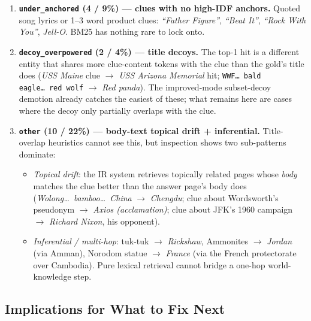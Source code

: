 \documentclass[11pt]{article}
\begin{document}
\begin{enumerate}
  \item \textbf{\texttt{under\_anchored} (4 / 9\%) --- clues with no high-IDF
        anchors.} Quoted song lyrics or 1--3 word product clues:
        \emph{``Father Figure''}, \emph{``Beat It''}, \emph{``Rock With You''},
        \emph{Jell-O}. BM25 has nothing rare to lock onto.

  \item \textbf{\texttt{decoy\_overpowered} (2 / 4\%) --- title decoys.} The
        top-1 hit is a different entity that shares more clue-content
        tokens with the clue than the gold's title does (\emph{USS Maine}
        clue $\to$ \emph{USS Arizona Memorial} hit; \texttt{WWF\ldots\ bald
        eagle\ldots\ red wolf} $\to$ \emph{Red panda}). The improved-mode
        subset-decoy demotion already catches the easiest of these; what
        remains here are cases where the decoy only partially overlaps
        with the clue.

  \item \textbf{\texttt{other} (10 / 22\%) --- body-text topical drift +
        inferential.} Title-overlap heuristics cannot see this, but
        inspection shows two sub-patterns dominate:
        \begin{itemize}
          \item \emph{Topical drift}: the IR system retrieves topically
                related pages whose \emph{body} matches the clue better
                than the answer page's body does (\emph{Wolong\ldots\
                bamboo\ldots\ China} $\to$ \emph{Chengdu}; clue about
                Wordsworth's pseudonym $\to$ \emph{Axios (acclamation)};
                clue about JFK's 1960 campaign $\to$ \emph{Richard Nixon},
                his opponent).
          \item \emph{Inferential / multi-hop}: tuk-tuk $\to$
                \emph{Rickshaw}, Ammonites $\to$ \emph{Jordan} (via Amman),
                Norodom statue $\to$ \emph{France} (via the French
                protectorate over Cambodia). Pure lexical retrieval
                cannot bridge a one-hop world-knowledge step.
        \end{itemize}
\end{enumerate}

\subsection{Implications for What to Fix Next}
\end{document}

